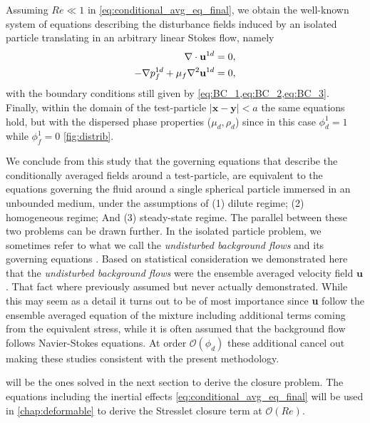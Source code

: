 Assuming $Re \ll 1$ in \ref{eq:conditional_avg_eq_final}, we obtain the well-known system of equations describing the disturbance fields induced by an isolated particle translating in an arbitrary linear Stokes flow, namely
\begin{align}
    \label{eq:conditional_avg_eq_final_stokes_mass}
    \div \textbf{u}^{1d} &= 0,  \\
    - \grad p_f^{1d} 
    + \mu_f \grad^2 \textbf{u}^{1d} 
    &= 0, 
    \label{eq:conditional_avg_eq_final_stokes}
\end{align}
with the boundary conditions still given by \ref{eq:BC_1,eq:BC_2,eq:BC_3}. 
Finally, within the domain of the test-particle $|\textbf{x}-\textbf{y}|<a$ the same equations hold, but with the dispersed phase properties ($\mu_d,\rho_d$) since in this case $\phi_d^1= 1$ while $\phi_f^1 =0$ \ref{fig:distrib}. 

We conclude from this study that the governing equations that describe the conditionally averaged fields around a test-particle, are equivalent to the equations governing the fluid around a single spherical particle immersed in an unbounded medium, 
under the assumptions of (1) dilute regime; (2) homogeneous regime; And (3) steady-state regime. 
The parallel between these two problems can be drawn further. 
In the isolated particle problem, we sometimes refer to what we call the \textit{undisturbed background flows} and its governing equations \citet{stone2001inertial}. 
Based on statistical consideration we demonstrated here that the \textit{undisturbed background flows} were the ensemble averaged velocity field $\textbf{u}$. 
That fact where previously assumed \citep{jackson1997locally,zhang1994ensemble} but never actually demonstrated. 
While this may seem as a detail it turns out to be of most importance since \textbf{u} follow the ensemble averaged equation of the mixture including additional terms coming from the equivalent stress, while it is often assumed that the background flow follows Navier-Stokes equations. 
At order $\mathcal{O}(\phi_d)$ these additional cancel out making these studies consistent with the present methodology. 

\label{eq:conditional_avg_eq_final_stokes,eq:conditional_avg_eq_final_stokes_mass} will be the ones solved in the next section to derive the closure problem. 
The equations including the inertial effects \eqref{eq:conditional_avg_eq_final} will be used in \ref{chap:deformable} to derive the Stresslet closure term at $\mathcal{O}(Re)$.
 


